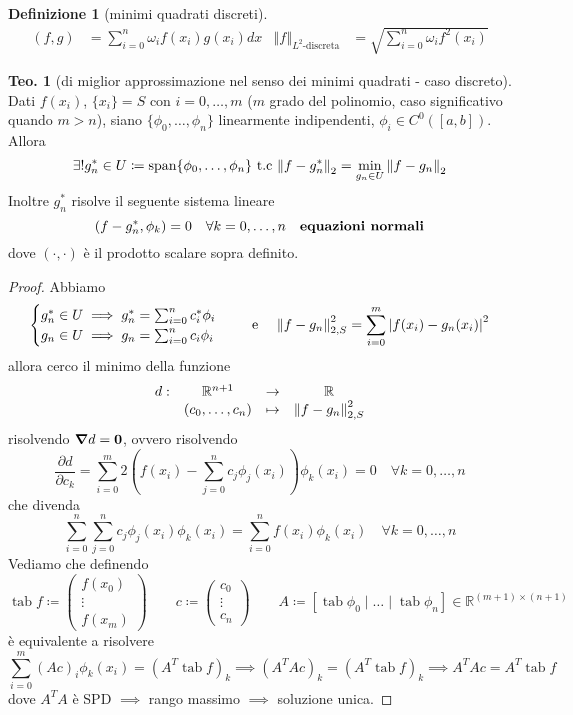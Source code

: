 \documentclass[a4paper,10pt]{article}
\theoremstyle{definition}
\DeclareMathOperator*{\tab}{tab}
\newcommand{\bv}{\boldsymbol} %
\newcommand{\cvv}[3]{\begin{pmatrix} #1 \\ #2 \\ #3 \end{pmatrix}} %
\newcommand{\re}{\mathbb{R}} %
\theoremstyle{indentdefinition}
\newtheorem{defn}{Definizione}[section]
\theoremstyle{indenttheorem}
\newtheorem{thm}{Teo.}
\theoremstyle{myremark}
\theoremstyle{indentgeneral}
\theoremstyle{plain}
\theoremstyle{plain}
\newenvironment{myboxed} 
{\noindent\begin{lrbox}{\mybox}\begin{minipage}{\textwidth}}
{\end{minipage}\end{lrbox}\fbox{\usebox{\mybox}}}
\begin{document}
\begin{defn}[minimi quadrati discreti]
\begin{align*}
\left(f,g\right) & =\sum_{i=0}^{n}\omega_{i}f\left(x_{i}\right)g\left(x_{i}\right)dx & \left\Vert f\right\Vert _{L^{2}\text{-discreta}} & =\sqrt{\sum_{i=0}^{n}\omega_{i}f^{2}\left(x_{i}\right)}
\end{align*}
\end{defn}

\begin{myboxed}
    \begin{thm}[di miglior approssimazione nel senso dei minimi quadrati - caso discreto]
        Dati $f(x_i)$, $\{x_i\}=S$ con $i=0,\dots,m$ ($m$ grado del polinomio, caso significativo quando $m>n$), siano $\{\phi_0,\ldots,\phi_n\}$ linearmente indipendenti, $\phi_i\in C^0([a,b])$. Allora 
        $$\exists!g_n^*\in U\coloneqq \text{span}\{\phi_0,\ldots,\phi_n\} \text{ t.c }\norm{f-g_n^*}_2=\min_{g_n\in U}\norm{f-g_n}_2$$
        Inoltre $g_n^*$ risolve il seguente sistema lineare
        $$(f-g_n^*,\phi_k)=0\quad \forall k=0,\ldots,n\quad\text{\textbf{equazioni normali}}$$
        dove $(\cdot,\cdot)$ è il prodotto scalare sopra definito.
    \end{thm}
\end{myboxed}

\begin{proof}
Abbiamo
$$\begin{cases}
     g^*_n\in U\implies  g^*_n=\sum_{i=0}^n c^*_i\phi_i \\
     g_n\in U\implies  g_n=\sum_{i=0}^n c_i\phi_i \\
\end{cases}\quad \text{ e }\quad \norm{f-g_n}_{2,S}^2=\sum_{i=0}^m\abs{f(x_i)-g_n(x_i)}^2$$
allora cerco il minimo della funzione 
$$\begin{array}{cccc}
  d:   & \re^{n+1} &\to&\re\\
     & (c_0,\dots,c_n) & \mapsto & \norm{f-g_n}_{2,S}^2
\end{array}$$
risolvendo $\grad d=\bv{0}$, ovvero risolvendo
$$\frac{\partial d}{\partial c_k}=\sum_{i=0}^m2\left(f(x_i)-\sum_{j=0}^nc_j\phi_j(x_i)\right)\phi_k(x_i)=0\quad \forall k=0,\dots, n$$
che divenda
$$\sum_{i=0}^n\sum_{j=0}^nc_j\phi_j(x_i)\phi_k(x_i)=\sum_{i=0}^nf(x_i)\phi_k(x_i)\quad \forall k=0,\dots, n$$
Vediamo che definendo 
$$\tab f\coloneqq \cvv{f(x_0)}{\vdots}{f(x_m)}\qquad c\coloneqq\cvv{c_0}{\vdots}{c_n}\qquad A\coloneqq[\tab\phi_0\mid \dots\mid\tab\phi_n]\in\re^{(m+1)\times(n+1)}$$
è equivalente a risolvere
$$\sum_{i=0}^m(Ac)_i\phi_k(x_i)=(A^T\tab f)_k\implies (A^TAc)_k=(A^T\tab f)_k\implies\boxed{A^TAc=A^T\tab f}$$
dove $A^TA$ è SPD $\implies$ rango massimo $\implies$ soluzione unica.
\end{proof}
\end{document}
